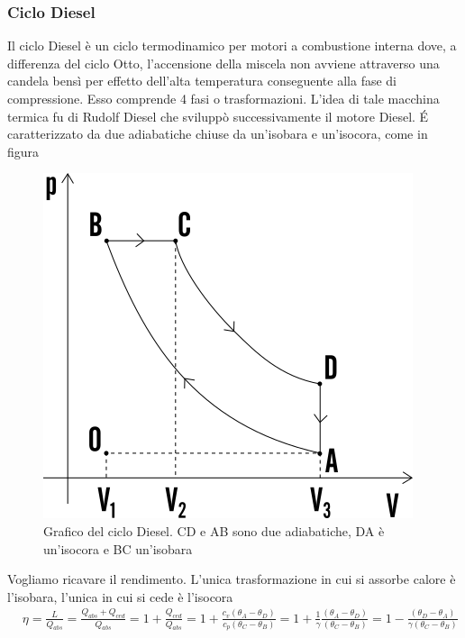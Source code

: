 \documentclass[10pt,a4paper]{article}
\begin{document}
\subsubsection{Ciclo Diesel}
Il ciclo Diesel è un ciclo termodinamico per motori a combustione interna dove, a differenza del ciclo Otto, l'accensione della miscela non avviene attraverso una candela bensì per effetto dell'alta temperatura conseguente alla fase di compressione. Esso comprende 4 fasi o trasformazioni. L'idea di tale macchina termica fu di Rudolf Diesel che sviluppò successivamente il motore Diesel. \'{E} caratterizzato da due adiabatiche chiuse da un'isobara e un'isocora, come in figura
\begin{figure}[h!]
	\centering
	\includegraphics[width=0.4\linewidth]{../images/ciclo-diesel}
	\caption{Grafico del ciclo Diesel. CD e AB sono due adiabatiche, DA è un'isocora e BC un'isobara}
	\label{fig:ciclo-diesel}
\end{figure}
\FloatBarrier
Vogliamo ricavare il rendimento. L'unica trasformazione in cui si assorbe calore è l'isobara, l'unica in cui si cede è l'isocora
\begin{align*}
	&\eta = \frac{L}{Q_{abs}} = \frac{Q_{abs}+Q_{ced}}{Q_{abs}} = 1 +\frac{Q_{ced}}{Q_{abs}} = 1 + \frac{c_v(\theta_A-\theta_D)}{c_p(\theta_C-\theta_B)} = 1+\frac{1}{\gamma}\frac{(\theta_A-\theta_D)}{(\theta_C-\theta_B)} = 1 - \frac{(\theta_D-\theta_A)}{\gamma(\theta_C-\theta_B)}
\end{align*}
\end{document}
